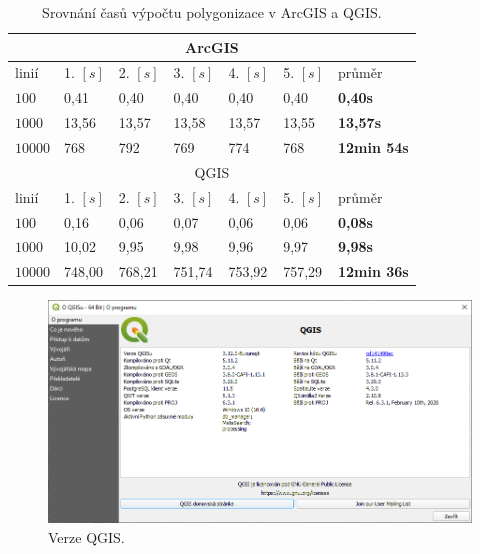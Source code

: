 \begin{table}
\begin{tabular}{ |p{1.4cm}||p{1.2cm}|p{1.2cm}|p{1.2cm}|p{1.2cm}|p{1.2cm}|p{2.2cm}|  }
\hline
\multicolumn{7}{|c|}{ArcGIS} \\
\hline
linií			&1. $[s]$	&2. $[s]$	&3. $[s]$	&4. $[s]$	&5. $[s]$	&průměr\\
\hline
$100$			&0,41		&0,40		&0,40		&0,40		&0,40		&\textbf{0,40s}\\			
$1000$			&13,56		&13,57		&13,58		&13,57		&13,55		&\textbf{13,57s}\\
$10000$			&768		&792		&769		&774		&768		&\textbf{12min 54s}\\
\hline
\hline
\multicolumn{7}{|c|}{QGIS} \\
\hline
linií			&1. $[s]$	&2. $[s]$	&3. $[s]$	&4. $[s]$	&5. $[s]$	&průměr\\
\hline
$100$			&0,16		&0,06		&0,07		&0,06		&0,06		&\textbf{0,08s}\\			
$1000$			&10,02		&9,95		&9,98		&9,96		&9,97		&\textbf{9,98s}\\
$10000$			&748,00		&768,21		&751,74		&753,92		&757,29		&\textbf{12min 36s}\\
\hline
\end{tabular}
\caption{Srovnání časů výpočtu polygonizace v ArcGIS a QGIS.}
\label{tab:pr_srovnani_casu}
\label{tab:srovnani}
\end{table}

\begin{figure}[h]
  \centering
  \includegraphics[width=12cm]{./pictures/prilohy/qgis_about.png}
  \caption{Verze QGIS.}
  \label{fig:qgis_about}
\end{figure}

